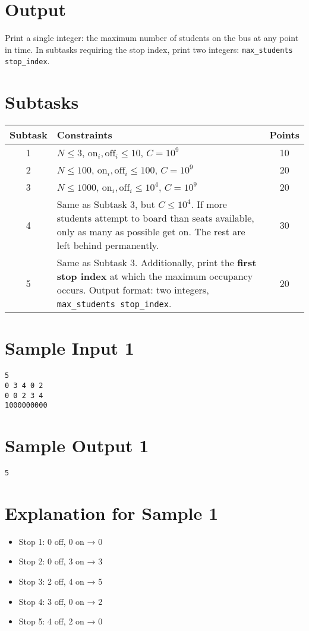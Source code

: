 \documentclass[12pt,a4paper]{article}
\begin{document}
\section*{Output}
Print a single integer: the maximum number of students on the bus at any point in time.  
In subtasks requiring the stop index, print two integers:  
\texttt{max\_students stop\_index}.

\section*{Subtasks}
\begin{center}
\begin{tabularx}{\textwidth}{|c|X|c|}
\hline
\textbf{Subtask} & \textbf{Constraints} & \textbf{Points} \\
\hline
1 & $N \leq 3$, $\text{on}_i, \text{off}_i \leq 10$, $C = 10^9$ & 10 \\
\hline
2 & $N \leq 100$, $\text{on}_i, \text{off}_i \leq 100$, $C = 10^9$ & 20 \\
\hline
3 & $N \leq 1000$, $\text{on}_i, \text{off}_i \leq 10^4$, $C = 10^9$ & 20 \\
\hline
4 & Same as Subtask 3, but $C \leq 10^4$. If more students attempt to board than seats available, only as many as possible get on. The rest are left behind permanently. & 30 \\
\hline
5 & Same as Subtask 3. Additionally, print the \textbf{first stop index} at which the maximum occupancy occurs. Output format: two integers, \texttt{max\_students stop\_index}. & 20 \\
\hline
\end{tabularx}
\end{center}

\section*{Sample Input 1}
\begin{verbatim}
5
0 3 4 0 2
0 0 2 3 4
1000000000
\end{verbatim}

\section*{Sample Output 1}
\begin{verbatim}
5
\end{verbatim}

\section*{Explanation for Sample 1}
\begin{itemize}
  \item Stop 1: 0 off, 0 on → 0  
  \item Stop 2: 0 off, 3 on → 3  
  \item Stop 3: 2 off, 4 on → 5  
  \item Stop 4: 3 off, 0 on → 2  
  \item Stop 5: 4 off, 2 on → 0  
\end{itemize}
\end{document}
